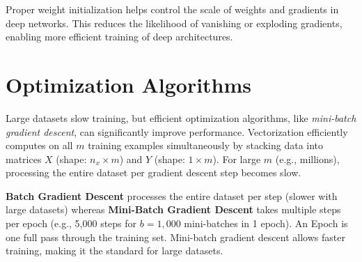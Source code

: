\documentclass[letterpaper,12pt,notitlepage,twoside]{report}
\begin{document}
Proper weight initialization helps control the scale of weights and gradients in deep networks. This reduces the likelihood of vanishing or exploding gradients, enabling more efficient training of deep architectures.

\section{Optimization Algorithms}
Large datasets slow training, but efficient optimization algorithms, like \emph{mini-batch gradient descent}, can significantly improve performance. Vectorization efficiently computes on all $m$ training examples simultaneously by stacking data into matrices $X$ (shape: $n_x \times m$) and $Y$ (shape: $1 \times m$). For large $m$ (e.g., millions), processing the entire dataset per gradient descent step becomes slow. 

\textbf{Batch Gradient Descent} processes the entire dataset per step (slower with large datasets) whereas \textbf{Mini-Batch Gradient Descent} takes multiple steps per epoch (e.g., 5,000 steps for $b = 1,000$ mini-batches in 1 epoch). An Epoch is one full pass through the training set. Mini-batch gradient descent allows faster training, making it the standard for large datasets.
\end{document}
